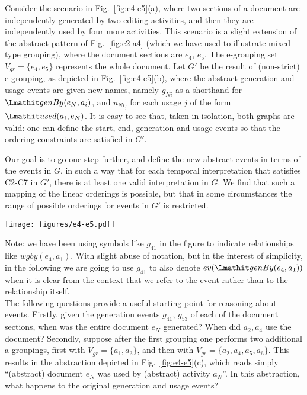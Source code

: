 Consider the scenario in Fig.~\ref{fig:e4-e5}(a), where two sections of a document are independently generated by two editing activities, and then they are independently used by four more activities. %
%
This scenario is a slight extension of the abstract pattern of Fig.~\ref{fig:e2-a4} (which we have used to illustrate mixed type grouping), where the document sections are $e_4$, $e_5$. 
%
The e-grouping set $V_{gr} = \{ e_4, e_5\}$ represents the whole document. Let $G'$ be the result of (non-strict) e-grouping, as depicted in Fig.~\ref{fig:e4-e5}(b), where the abstract generation and usage events are given new names, namely $g_{Ni}$ as a shorthand for $\wgby(e_N,a_i)$, and $u_{Ni_j}$ for each usage $j$ of the form $\used(a_i, e_N)$. It is easy to see that, taken in isolation, both graphs are valid: one can define the start, end, generation and usage events so that the ordering constraints are satisfied in $G'$.
%

Our goal is to go one step further, and define the new abstract events in terms of the events in $G$, in such a way that for each temporal interpretation that satisfies C2-C7 in $G'$, there is at least one valid interpretation in $G$.
%
We find that such a mapping of the linear orderings is possible,  but that in some circumstances the range of possible orderings for events in $G'$ is restricted.


\begin{figure*}
\centering
\texttt{[image: figures/e4-e5.pdf]} 
\caption{Abstraction over a document content, and associated abstracted events} \label{fig:e4-e5}
\end{figure*}

Note: we have been using symbols like $g_{41}$ in the figure to indicate relationships like $wgby(e_4, a_1)$. 
With slight abuse of notation, but in the interest of simplicity, in the following we are going to use $g_{41}$ to also denote $ev(\wgby(e_4, a_1))$ when it is clear from the context that we refer to the event rather than to the relationship itself.
\\

The following questions provide a useful starting point for reasoning about events. Firstly, given the generation events $g_{41}$, $g_{53}$  of each of the document sections, when was the entire document $e_N$ generated? 
%
When did $a_2, a_4$ use the document? 
%
Secondly,  suppose after the first grouping one performs two additional a-groupings, first with $V_{gr} = \{a_1, a_3\}$, and then with $V_{gr} = \{a_2, a_4, a_5, a_6\}$.
%
 This results in the abstraction depicted in Fig.~\ref{fig:e4-e5}(c), which reads simply ``(abstract) document $e_N$ was used by (abstract) activity $a_N$''. 
 In this abstraction, what happens to the original generation and usage events?

